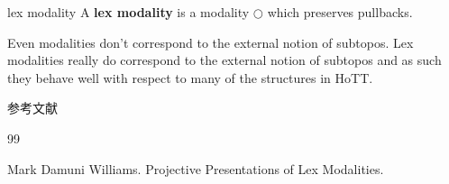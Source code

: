 \documentclass{beamer}
\newcommand{\OO}{\bigcirc}
\begin{document}
\begin{frame}{lex modality}
    A \textbf{lex modality} is a modality $\OO$ which preserves pullbacks.

\vspace{6mm}

    Even modalities don't correspond to the external notion of subtopos. Lex modalities really do correspond to the external notion of subtopos and as such they behave well with respect to many of the structures in HoTT.
\end{frame}

\begin{frame}[allowframebreaks]{参考文献}
\begin{thebibliography}{99}

Mark Damuni Williams. Projective Presentations of Lex Modalities.

\end{thebibliography}
\end{frame}
\end{document}
